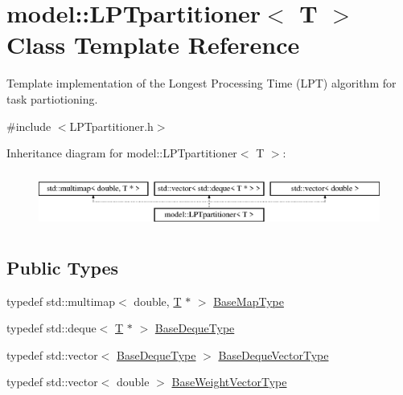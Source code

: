 \hypertarget{classmodel_1_1_l_p_tpartitioner}{}\section{model\+:\+:L\+P\+Tpartitioner$<$ T $>$ Class Template Reference}
\label{classmodel_1_1_l_p_tpartitioner}


Template implementation of the Longest Processing Time (L\+P\+T) algorithm for task partiotioning.  




{\ttfamily \#include $<$L\+P\+Tpartitioner.\+h$>$}

Inheritance diagram for model\+:\+:L\+P\+Tpartitioner$<$ T $>$\+:\begin{figure}[H]
\begin{center}
\leavevmode
\includegraphics[height=1.857380cm]{classmodel_1_1_l_p_tpartitioner}
\end{center}
\end{figure}
\subsection*{Public Types}
\begin{DoxyCompactItemize}
\item 
typedef std\+::multimap$<$ double, \hyperlink{_spline_node_base__corder1_8h_a82692d3a5502b91460591f1d5504314a}{T} $\ast$ $>$ \hyperlink{classmodel_1_1_l_p_tpartitioner_aa30ca4660424b257214f77ed1023371d}{Base\+Map\+Type}
\item 
typedef std\+::deque$<$ \hyperlink{_spline_node_base__corder1_8h_a82692d3a5502b91460591f1d5504314a}{T} $\ast$ $>$ \hyperlink{classmodel_1_1_l_p_tpartitioner_a29fe16f05a6fed1fb672a28379ec80c2}{Base\+Deque\+Type}
\item 
typedef std\+::vector$<$ \hyperlink{classmodel_1_1_l_p_tpartitioner_a29fe16f05a6fed1fb672a28379ec80c2}{Base\+Deque\+Type} $>$ \hyperlink{classmodel_1_1_l_p_tpartitioner_a218d5e533eb5d82b957d5e42898a6a3e}{Base\+Deque\+Vector\+Type}
\item 
typedef std\+::vector$<$ double $>$ \hyperlink{classmodel_1_1_l_p_tpartitioner_aa4323b2f80fcb1815e63b7c183f04fce}{Base\+Weight\+Vector\+Type}
\end{DoxyCompactItemize}
